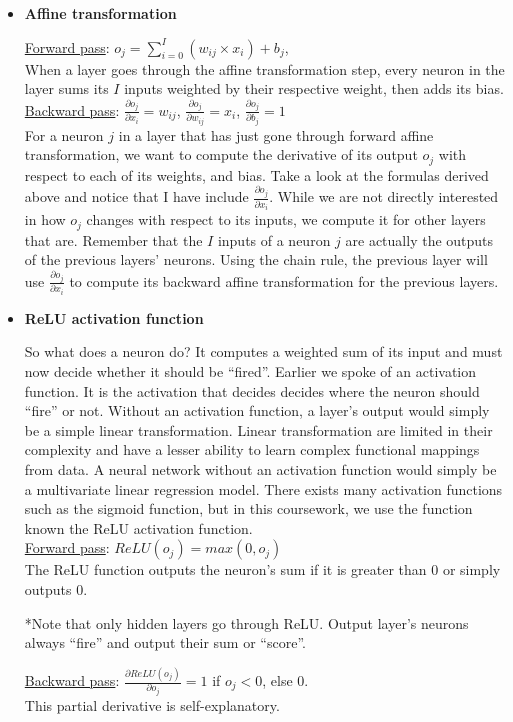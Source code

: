 \begin{itemize}
   \item \textbf{Affine transformation}
  
     \underline{Forward pass}: $o_j= \sum\limits_{i=0}^{I} (w_{ij} \times x_{i}) + b_j$, \\
     When a layer goes through the affine transformation step,
     every neuron in the layer sums its $I$ inputs weighted by their respective weight, then adds its bias.\\

     \underline{Backward pass}: $\frac{\partial o_j}{\partial x_i} = w_{ij}$,
     \space\space $\frac{\partial o_j}{\partial w_{ij}} = x_i$,
     \space\space$\frac{\partial o_j}{\partial b_j} = 1$\\ 
     For a neuron $j$ in a layer that has just gone through forward affine transformation,
     we want to compute the derivative of its output $o_j$ with respect to each of its weights, and bias.
     Take a look at the formulas derived above and notice that I have include $\frac{\partial o_j}{\partial x_i}$.
     While we are not directly interested in how $o_j$ changes with respect to its inputs, we compute it for other layers that are.
     Remember that the $I$ inputs of a neuron $j$ are actually the outputs of the previous layers' neurons.
     Using the chain rule, the previous layer will use $\frac{\partial o_j}{\partial x_i}$
     to compute its backward affine transformation for the previous layers.

   \item \textbf{ReLU activation function}
   
     So what does a neuron do? It computes a weighted sum of its input and must now decide whether it should be ``fired''.
     Earlier we spoke of an activation function.
     It is the activation that decides decides where the neuron should ``fire'' or not.
     Without an activation function, a layer's output would simply be a simple linear transformation.
     Linear transformation are limited in their complexity and have a lesser ability to learn complex functional mappings from data.
     A neural network without an activation function would simply be a multivariate linear regression model.
     There exists many activation functions such as the sigmoid function,
     but in this coursework, we use the function known the ReLU activation function.\\
     
     \underline{Forward pass}: $ReLU(o_j) = max(0,o_j)$\\
     The ReLU function outputs the neuron's sum if it is greater than 0 or simply outputs 0.
     
     *Note that only hidden layers go through ReLU.
     Output layer's neurons always ``fire'' and output their sum or ``score''.

     \underline{Backward pass}: $\frac{\partial ReLU(o_j)}{\partial o_j} = 1$ if $o_j < 0$, else 0.\\
     This partial derivative is self-explanatory.
     
\end{itemize}
